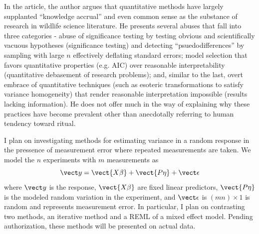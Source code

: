 \documentclass{homework}
\begin{document}

\begin{solution}
In the article, the author argues that quantitative methods have largely supplanted ``knowledge
accrual'' and even common sense as the substance of research in wildlife science literature.  He
presents several abuses that fall into three categories -
abuse of significance testing by testing obvious and scientifically vacuous
hypotheses (significance testing) and detecting ``psuedodifferences'' by sampling with large $n$ effectively deflating standard errors; model selection that favors quantitative properties (e.g. AIC) over reasonable interpretability (quantitative debasement of research problems); and, similar to the last, overt embrace of quantitative techniques (such as esoteric transformations to satisfy variance homogeneity) that render reasonable interpretation impossible (results lacking information).  He does not offer much in the way of explaining why these practices have become prevalent other than anecdotally referring to human tendency toward ritual.
\end{solution}


I plan on investigating methods for estimating variance in a random response in the pressence of measurement error where repeated measurements are taken.  We model the $n$ experiments with $m$ measurements as 
$$
  \vect y = \vect{X\beta} + \vect{P\eta} + \vect \epsilon
$$
where $\vect y$ is the response, $\vect{X\beta}$ are fixed linear predictors, $\vect{P\eta}$ is the modeled random variation in the experiment, and $\vect \epsilon$ is $(m n)\times 1$ is random and represents measurement error. 
In particular, I plan on contrasting two methods, an iterative method and a REML of a mixed effect model.  Pending authorization, these methods will be presented on actual data.
\end{document}
